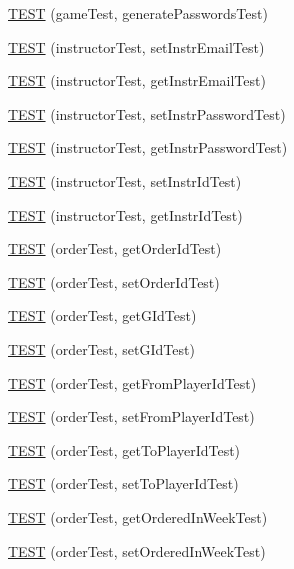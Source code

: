 \begin{DoxyCompactItemize}
\item 
\hyperlink{group__group2_ga2aab8e43a7014d94f924bcc59f7bbd09}{T\+E\+ST} (game\+Test, generate\+Passwords\+Test)
\item 
\hyperlink{group__group2_ga9f5e8daded3608c6308588b939d435c6}{T\+E\+ST} (instructor\+Test, set\+Instr\+Email\+Test)
\item 
\hyperlink{group__group2_gaa1ca034e04a63b41f5577be5f84ddd12}{T\+E\+ST} (instructor\+Test, get\+Instr\+Email\+Test)
\item 
\hyperlink{group__group2_ga0f88e7e0396e122e93cc2b82b1fe6733}{T\+E\+ST} (instructor\+Test, set\+Instr\+Password\+Test)
\item 
\hyperlink{group__group2_ga4415465f8a128f4b26959e7299b6ec6f}{T\+E\+ST} (instructor\+Test, get\+Instr\+Password\+Test)
\item 
\hyperlink{group__group2_ga1eef3dd6afd1cfd3bfcced9fd734492c}{T\+E\+ST} (instructor\+Test, set\+Instr\+Id\+Test)
\item 
\hyperlink{group__group2_ga14b68f5d4a879f5c32075d25bcd1b058}{T\+E\+ST} (instructor\+Test, get\+Instr\+Id\+Test)
\item 
\hyperlink{group__group2_gab3cc359b32bb3e07aece88abee38991d}{T\+E\+ST} (order\+Test, get\+Order\+Id\+Test)
\item 
\hyperlink{group__group2_ga133872a9e6fe94a464244f8d2c31f4d4}{T\+E\+ST} (order\+Test, set\+Order\+Id\+Test)
\item 
\hyperlink{group__group2_ga943f547dd9766972f436f99c3e26d7b4}{T\+E\+ST} (order\+Test, get\+G\+Id\+Test)
\item 
\hyperlink{group__group2_ga4f6567cf2ba654f98631644f31ab91dd}{T\+E\+ST} (order\+Test, set\+G\+Id\+Test)
\item 
\hyperlink{group__group2_gace52ab2c1cc4809bd567249a7f4ebb8b}{T\+E\+ST} (order\+Test, get\+From\+Player\+Id\+Test)
\item 
\hyperlink{group__group2_ga6f2b7ec37bf6230c01a887ee1c49a8cb}{T\+E\+ST} (order\+Test, set\+From\+Player\+Id\+Test)
\item 
\hyperlink{group__group2_ga952832d059d6de1a958b81701e0bb7ed}{T\+E\+ST} (order\+Test, get\+To\+Player\+Id\+Test)
\item 
\hyperlink{group__group2_ga0b7c397d9be139038856dccc5a3269cb}{T\+E\+ST} (order\+Test, set\+To\+Player\+Id\+Test)
\item 
\hyperlink{group__group2_gaa446fcfe29aea8d8da3faf1358adb8d8}{T\+E\+ST} (order\+Test, get\+Ordered\+In\+Week\+Test)
\item 
\hyperlink{group__group2_ga11d261312827fd420cf539dacc3541ab}{T\+E\+ST} (order\+Test, set\+Ordered\+In\+Week\+Test)

\end{DoxyCompactItemize}
